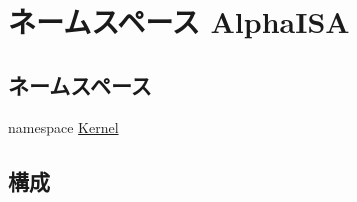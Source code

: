 \hypertarget{namespaceAlphaISA}{
\section{ネームスペース AlphaISA}
\label{namespaceAlphaISA}
}
\subsection*{ネームスペース}
\begin{DoxyCompactItemize}
\item 
namespace \hyperlink{namespaceAlphaISA_1_1Kernel}{Kernel}
\end{DoxyCompactItemize}
\subsection*{構成}
